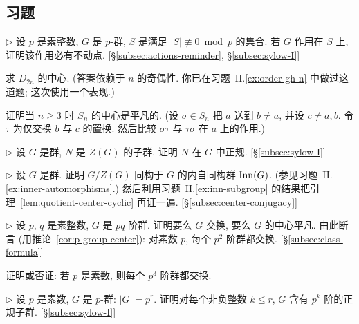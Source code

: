 \subsection*{习题}
{}

\begin{prob}
\label{ex:p-group-fixed}
$\triangleright$ 设 $p$ 是素整数, $G$ 是 $p$-群, $S$ 是满足 $|S| \not\equiv 0 \bmod p$ 的集合. 若 $G$ 作用在 $S$ 上, 证明该作用必有不动点. [\S\ref{subsec:actions-reminder}, \S\ref{subsec:sylow-I}]
\end{prob}

\begin{prob}
\label{ex:center-dihedral}
求 $D_{2n}$ 的中心. (答案依赖于 $n$ 的奇偶性. 你已在习题~II.\ref{ex:order-gh-n} 中做过这道题; 这次使用一个表现.)
\end{prob}

\begin{prob}
\label{ex:center-sn}
证明当 $n \geq 3$ 时 $S_n$ 的中心是平凡的. (设 $\sigma \in S_n$ 把 $a$ 送到 $b \neq a$, 并设 $c \neq a, b$. 令 $\tau$ 为仅交换 $b$ 与 $c$ 的置换. 然后比较 $\sigma\tau$ 与 $\tau\sigma$ 在 $a$ 上的作用.)
\end{prob}

\begin{prob}
\label{ex:center-subgroup-normal}
$\triangleright$ 设 $G$ 是群, $N$ 是 $Z(G)$ 的子群. 证明 $N$ 在 $G$ 中正规. [\S\ref{subsec:sylow-I}]
\end{prob}

\begin{prob}
\label{ex:G-Z-cyclic-inn}
$\triangleright$ 设 $G$ 是群. 证明 $G/Z(G)$ 同构于 $G$ 的内自同构群 $\operatorname{Inn}(G)$. (参见习题~II.\ref{ex:inner-automorphisms}.) 然后利用习题~II.\ref{ex:inn-subgroup} 的结果把引理~\ref{lem:quotient-center-cyclic} 再证一遍. [\S\ref{subsec:center-conjugacy}]
\end{prob}

\begin{prob}
\label{ex:pq-center}
$\triangleright$ 设 $p$, $q$ 是素整数, $G$ 是 $pq$ 阶群. 证明要么 $G$ 交换, 要么 $G$ 的中心平凡. 由此断言 (用推论~\ref{cor:p-group-center}): 对素数 $p$, 每个 $p^2$ 阶群都交换. [\S\ref{subsec:class-formula}]
\end{prob}

\begin{prob}
\label{ex:p3-commutative}
证明或否证: 若 $p$ 是素数, 则每个 $p^3$ 阶群都交换.
\end{prob}

\begin{prob}
\label{ex:p-subgroup-chain}
$\triangleright$ 设 $p$ 是素数, $G$ 是 $p$-群: $|G| = p^r$. 证明对每个非负整数 $k \leq r$, $G$ 含有 $p^k$ 阶的正规子群. [\S\ref{subsec:sylow-I}]
\end{prob}

